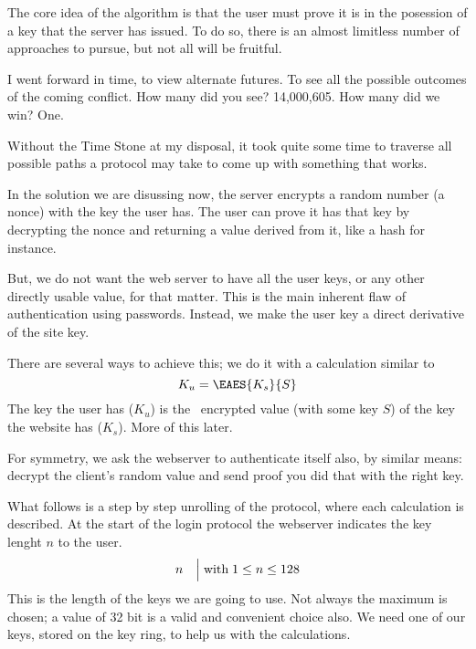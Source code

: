 

\label{rudimentary-login}
The core idea of the algorithm is that the user must prove it is in the posession of a key that the server has issued.
To do so, there is an almost limitless number of approaches to pursue, but not all will be fruitful.
\begin{dialogue}
	I went forward in time, to view alternate futures. To see all the possible outcomes of the coming conflict.
   How many did you see?
	14,000,605.
	How many did we win?
	One.
\end{dialogue}
Without the Time Stone at my disposal,
it took quite some time to traverse all possible paths a protocol may take to come up with something that works.
\par
In the solution we are disussing now, the server encrypts a random number (a nonce) with the key the user has.
The user can prove it has that key by decrypting the nonce and returning a value derived from it, like a hash for instance.
\par
But, we do not want the web server to have all the user keys, or any other directly usable value, for that matter.
This is the main inherent flaw of authentication using passwords.
Instead, we make the user key a direct derivative of the site key.
\par
There are several ways to achieve this; we do it with a calculation similar to
\[K_u = \EAES{K_s}{S}\]
The key the user has (\(K_u\)) is the \AES\ encrypted value (with some key \(S\)) of the key the website has (\(K_s\)).
More of this later.
\par
For symmetry, we ask the webserver to authenticate itself also, by similar means: decrypt the client's random value and send proof you did that with the right key.
\par
What follows is a step by step unrolling of the protocol, where each calculation is described.
At the start of the login protocol the webserver indicates the key lenght \(n\) to the user.
\[n\quad\Bigl\lvert\thickspace\text{with}\thickspace 1\le{n}\le128\]
This is the length of the keys we are going to use.
Not always the maximum is chosen; a value of 32 bit is a valid and convenient choice also.
We need one of our keys, stored on the key ring, to help us with the calculations.
